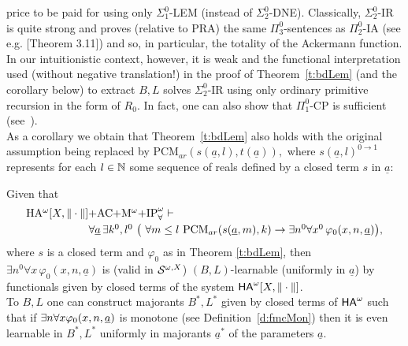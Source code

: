 price to be paid for using only $\Sigma^0_1$-LEM (instead of 
$\Sigma^0_2$-DNE). Classically, $\Sigma^0_2$-IR is quite strong and proves 
(relative to PRA) the same $\Pi^0_3$-sentences as $\Pi^0_2$-IA 
(see e.g. \cite{Sieg}[Theorem 3.11]) and so, 
in particular, the totality of the Ackermann function. In our intuitionistic 
context, however, it is weak and the functional interpretation used 
(without negative translation!) in the 
proof of Theorem~\ref{t:bdLem} (and the corollary below) to extract $B,L$ solves 
$\Sigma^0_2$-IR using only ordinary primitive recursion in the form of 
$R_0.$ In fact, one can also show that $\Pi^0_1$-CP is sufficient 
(see~\cite{KS13}). \\ [2mm]
As a corollary we obtain that Theorem~\ref{t:bdLem} also holds with 
the original assumption being replaced by 
PCM$_{ar}(s(\underline{a},l),t(\underline{a})),$ where 
$s(\underline{a},l)^{0\to 1}$ represents for each $l\in\NN$ 
some sequence of reals defined by 
a closed term $s$ in $\underline{a}:$
\begin{cor} \label{cor.2.11}
Given that 
\[\ba{l} \mbox{\rm HA$^{\omega}[X,\|\cdot\|]+$AC$+$M$^{\omega}+
$IP}^{\omega}_{\forall}\vdash \\[1mm] \hspace*{2cm}  
\forall \underline{a}\,\exists k^0 ,l^0\ \big( 
\ \forall m \le l\ \mbox{\rm PCM}_{ar}(s(\underline{a},m),k)
 \rightarrow \exists n^0\forall x^0\,\varphi_0(x,n,\underline{a})\big), 
\ea \] 
where $s$ is a closed term and $\varphi_0$ as in Theorem \ref{t:bdLem}, then 
$\exists n^0\forall x\,\varphi_0(x,n,\underline{a})$ 
is (valid in ${\cal S}^{\omega,X}$) 
$(B,L)$-learnable (uniformly in $\underline{a}$) by functionals given by 
closed terms of the system $\ha[X,\|\cdot\|]$.\\
To $B,L$ one can construct majorants 
$B^*,L^*$ given by closed terms of $\ha$ such that 
if $\exists n\forall x \phi_0(x,n,\tup a)$ is monotone (see Definition~\ref{d:fmcMon}) then it is even learnable in $B^*,L^*$ uniformly in
majorants $\underline{a}^*$ of the parameters $\underline{a}$.
\end{cor}   
